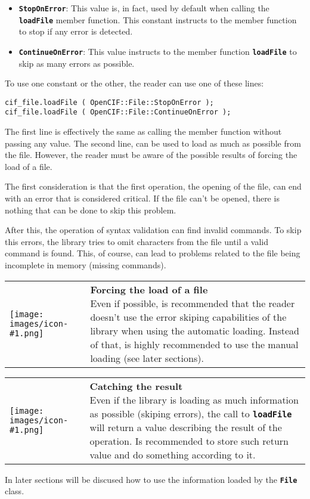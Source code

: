 \documentclass[11pt,twoside,openany,x11names,svgnames]{memoir}
\makeatletter
\newcommand{\IconNote}[3]
{
	\begin{table}[ht]
	\begin{tabular}{ lm{\dimexpr\textwidth-8\tabcolsep-\wd0}@{}}
		\toprule
		\texttt{[image: images/icon-\#1.png]}
		&
		\parbox[t]{155mm}{
		\textbf{#2} \\
		#3
		}
	\end{tabular}
\end{table}
}
\makeatother
\begin{document}
\begin{itemize}
	\item \textbf{\texttt{StopOnError}}: This value is, in fact, used by default when calling the \textbf{\texttt{loadFile}} member function. This constant instructs to the member function to stop if any error is detected.
	
	\item \textbf{\texttt{ContinueOnError}}: This value instructs to the member function \textbf{\texttt{loadFile}} to skip as many errors as possible.
\end{itemize}

To use one constant or the other, the reader can use one of these lines:

\begin{lstlisting}[frame=single,style=CPPStyle]
cif_file.loadFile ( OpenCIF::File::StopOnError );
cif_file.loadFile ( OpenCIF::File::ContinueOnError );
\end{lstlisting}

The first line is effectively the same as calling the member function without passing any value. The second line, can be used to load as much as possible from the file. However, the reader must be aware of the possible results of forcing the load of a file.

The first consideration is that the first operation, the opening of the file, can end with an error that is considered critical. If the file can't be opened, there is nothing that can be done to skip this problem.

After this, the operation of syntax validation can find invalid commands. To skip this errors, the library tries to omit characters from the file until a valid command is found. This, of course, can lead to problems related to the file being incomplete in memory (missing commands).

\IconNote
	{error}
	{Forcing the load of a file}
	{Even if possible, is recommended that the reader doesn't use the error skiping capabilities of the library when using the automatic loading. Instead of that, is highly recommended to use the manual loading (see later sections).}
	
\IconNote
	{info}
	{Catching the result}
	{Even if the library is loading as much information as possible (skiping errors), the call to \textbf{\texttt{loadFile}} will return a value describing the result of the operation. Is recommended to store such return value and do something according to it.}
	
In later sections will be discused how to use the information loaded by the \textbf{\texttt{File}} class.
\end{document}
